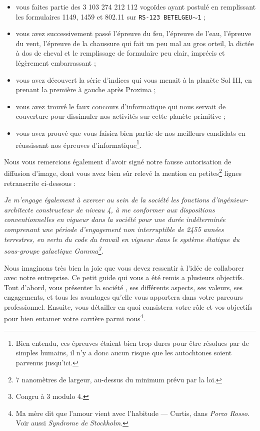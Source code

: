 \begin{itemize}
    \item vous faites partie des 3 103 274 212 112 vogoïdes ayant postulé en
        remplissant les formulaires 1149, 1459 et 802.11 sur \texttt{RS-123
        BETELGEU$\sim$1} ;
    \item vous avez successivement passé l'épreuve du feu, l'épreuve de l'eau,
        l'épreuve du vent, l'épreuve de la chaussure qui fait un peu mal au
        gros orteil, la dictée à dos de cheval et le remplissage de formulaire
        peu clair, imprécis et légèrement embarrassant ;
    \item vous avez découvert la série d'indices qui vous menait à la planète
        Sol III, en prenant la première à gauche après Proxima ;
    \item vous avez trouvé le faux concours d'informatique qui nous servait de
        couverture pour dissimuler nos activités sur cette planète primitive ;
    \item vous avez prouvé que vous faisiez bien partie de nos meilleurs
        candidats en réussissant nos épreuves d'informatique\footnote{Bien
        entendu, ces épreuves étaient bien trop dures pour être résolues par de
        simples humains, il n'y a donc aucun risque que les autochtones soient
        parvenus jusqu'ici.}.
\end{itemize}

Nous vous remercions également d'avoir signé notre fausse autorisation de
diffusion d'image, dont vous avez bien sûr relevé la mention en
petites\footnote{7 nanomètres de largeur, au-dessus du minimum prévu par la
loi.} lignes retranscrite ci-dessous :

\emph{Je m'engage également à exercer au sein de la société \provogon{} les
fonctions d'ingénieur-architecte constructeur de niveau 4, à me conformer aux
dispositions conventionnelles en vigueur dans la société \provogon{} pour une
durée indéterminée comprenant une période d'engagement non interruptible de
2455 années terrestres, en vertu du code du travail en vigueur dans le système
étatique du sous-groupe galactique Gamma\footnote{Congru à 3 modulo 4.}.}

\newpage

Nous imaginons très bien la joie que vous devez ressentir à l'idée de
collaborer avec notre entreprise. Ce petit guide qui vous a été remis a
plusieurs objectifs. Tout d'abord, vous présenter la société \provogon{}, ses différents
aspects, ses valeurs, ses engagements, et tous les avantages qu'elle vous
apportera dans votre parcours professionnel. Ensuite, vous détailler en quoi
consistera votre rôle et vos objectifs pour bien entamer votre carrière parmi
nous\footnote{\og Ma mère dit que l'amour vient avec l'habitude \fg{} ---
Curtis, dans \emph{Porco Rosso}. Voir aussi \emph{Syndrome de Stockholm}.}.

